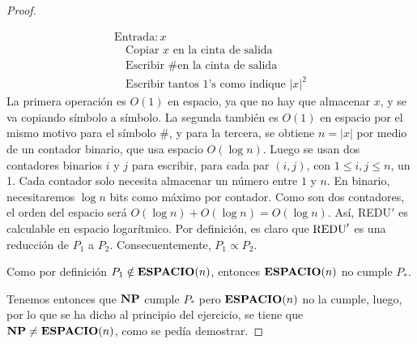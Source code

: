 \begin{ejercicio}
\begin{proof}
\begin{enumerate}
\begin{enumerate}
                $$
                \begin{array}{l}
                \text{Entrada}: x\\
                \quad \text{Copiar $x$ en la cinta de salida} \\
                \quad \text{Escribir \# en la cinta de salida } \\
                \quad \text{Escribir tantos 1's como indique } |x|^2
                \end{array}
                $$
                La primera operación es $O(1)$ en espacio, ya que no hay que almacenar $x$, y se va copiando
                símbolo a símbolo. La segunda también es $O(1)$ en espacio por el mismo motivo para el 
                símbolo \#, y para la tercera, se obtiene $n = |x|$ por medio de un contador binario, que usa espacio $O(\log n)$. Luego se usan 
                dos contadores binarios $i$ y $j$ para escribir, para cada par $(i,j)$,
                con $1 \leq i,j \leq n$, un 1. Cada contador solo necesita almacenar un número entre $1$ y $n$.
                En binario, necesitaremos $\log n$ bits como máximo por contador. Como son dos contadores, el orden del espacio
                será $O(\log n) + O(\log n) = O(\log n)$. Así, REDU$'$ es calculable en espacio logarítmico.
                Por definición, es claro que $\text{REDU}'$ es una reducción de $P_1$ a $P_2$. Consecuentemente,
                $P_1 \propto P_2$.  
            \end{enumerate}

            Como por definición $P_1 \notin \textbf{ESPACIO}(n)$, entonces $\textbf{ESPACIO}(n)$ no cumple $P_{*}$.
        \end{enumerate}
        Tenemos entonces que $\textbf{NP}$ cumple $P_{*}$ pero $\textbf{ESPACIO}(n)$ no la cumple, luego, por lo que se ha dicho
        al principio del ejercicio, se tiene que $\textbf{NP} \neq \textbf{ESPACIO}(n)$, como se pedía demostrar.
    \end{proof}
\end{ejercicio}
